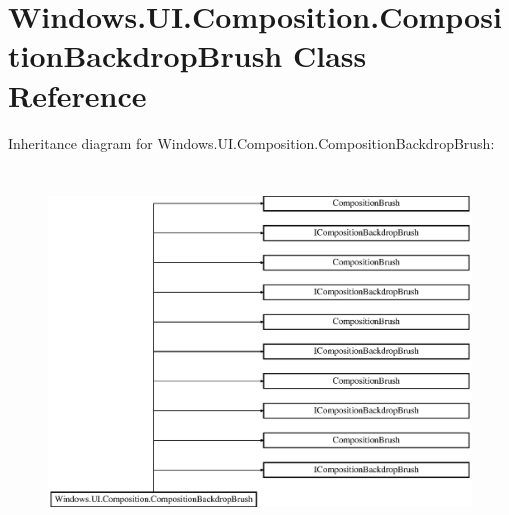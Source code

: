 \hypertarget{class_windows_1_1_u_i_1_1_composition_1_1_composition_backdrop_brush}{}\section{Windows.\+U\+I.\+Composition.\+Composition\+Backdrop\+Brush Class Reference}
\label{class_windows_1_1_u_i_1_1_composition_1_1_composition_backdrop_brush}
Inheritance diagram for Windows.\+U\+I.\+Composition.\+Composition\+Backdrop\+Brush\+:\begin{figure}[H]
\begin{center}
\leavevmode
\includegraphics[height=9.746835cm]{class_windows_1_1_u_i_1_1_composition_1_1_composition_backdrop_brush}
\end{center}
\end{figure}
